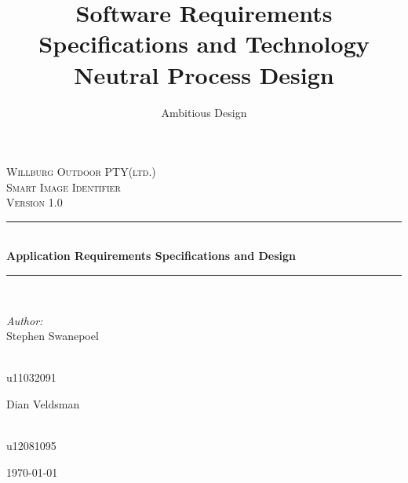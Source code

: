 \documentclass[a4paper,12pt]{report}
\author{Ambitious Design}
\title{ Software Requirements Specifications and Technology Neutral Process Design}
\newcommand{\HRule}{\rule{\linewidth}{0.5mm}}
\begin{document}
\setlength{\parskip}{6pt}

\begin{titlepage}

\begin{center}
\textsc{\LARGE Willburg Outdoor PTY(ltd.)}\\[1.5cm]
\textsc{\Large Smart Image Identifier }\\[1.0cm]
\textsc{\Large Version 1.0 }\\[0.5cm]
\HRule \\[0.4cm]
{ \huge \bfseries  Application Requirements Specifications and Design}\\[0.4cm]
\HRule \\[0.4cm]
\begin{minipage}{0.4\textwidth}
\begin{flushleft} \large
\emph{Author:}\\
Stephen {Swanepoel}
\end{flushleft}
\end{minipage}
\begin{minipage}{0.4\textwidth}
\begin{flushright} \large
\emph{} \\
u11032091
\end{flushright}
\end{minipage}
\begin{minipage}{0.4\textwidth}
\begin{flushleft} \large
Dian {Veldsman}
\end{flushleft}
\end{minipage}
\begin{minipage}{0.4\textwidth}
\begin{flushright} \large
\emph{} \\
u12081095
\end{flushright}
\end{minipage}


{\large \today}
\end{center}
\end{titlepage}
\footnotesize
\normalsize

\renewcommand{\thesection}{\arabic{section}}
\newpage
\end{document}
